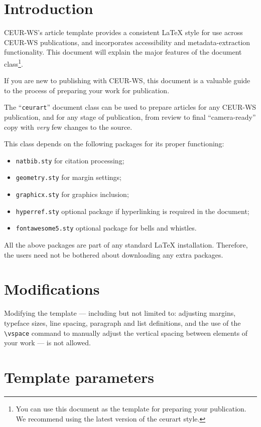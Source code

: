 \documentclass[
]{ceurart}
\begin{document}
\section{Introduction}

CEUR-WS's article template provides a consistent \LaTeX{} style for
use across CEUR-WS publications, and incorporates accessibility and
metadata-extraction functionality. This document will explain the
major features of the document class\footnote{You can use this
  document as the template for preparing your publication. We
  recommend using the latest version of the ceurart style.}.

If you are new to publishing with CEUR-WS, this document is a valuable
guide to the process of preparing your work for publication.

The ``\verb|ceurart|'' document class can be used to prepare articles
for any CEUR-WS publication, and for any stage of publication, from
review to final ``camera-ready'' copy with {\itshape very} few changes
to the source.

This class depends on the following packages
for its proper functioning:

\begin{itemize}
\item \verb|natbib.sty| for citation processing;
\item \verb|geometry.sty| for margin settings;
\item \verb|graphicx.sty| for graphics inclusion;
\item \verb|hyperref.sty| optional package if hyperlinking is required in
  the document;
\item \verb|fontawesome5.sty| optional package for bells and whistles.
\end{itemize}

All the above packages are part of any
standard \LaTeX{} installation.
Therefore, the users need not be
bothered about downloading any extra packages.

\section{Modifications}

Modifying the template --- including but not limited to: adjusting
margins, typeface sizes, line spacing, paragraph and list definitions,
and the use of the \verb|\vspace| command to manually adjust the
vertical spacing between elements of your work --- is not allowed.

\section{Template parameters}
\end{document}
